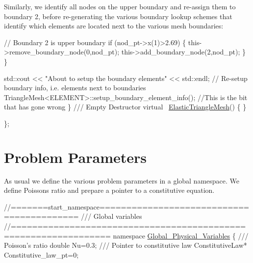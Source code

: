 Similarly, we identify all nodes on the upper boundary and re-\/assign them to boundary 2, before re-\/generating the various boundary lookup schemes that identify which elements are located next to the various mesh boundaries\+:


\begin{DoxyCodeInclude}

     \textcolor{comment}{// Boundary 2 is upper boundary}
     \textcolor{keywordflow}{if} (nod\_pt->x(1)>2.69)
      \{
       this->remove\_boundary\_node(0,nod\_pt);
       this->add\_boundary\_node(2,nod\_pt);
      \}
    \}

   std::cout << \textcolor{stringliteral}{"About to setup the boundary elements"} << std::endl;
   \textcolor{comment}{// Re-setup boundary info, i.e. elements next to boundaries}
   TriangleMesh<ELEMENT>::setup\_boundary\_element\_info();
   \textcolor{comment}{//This is the bit that has gone wrong}
  \}
\textcolor{comment}{}
\textcolor{comment}{ /// Empty Destructor}
\textcolor{comment}{} \textcolor{keyword}{virtual} ~\hyperlink{classElasticTriangleMesh}{ElasticTriangleMesh}() \{ \}

\};

\end{DoxyCodeInclude}




 

\hypertarget{index_namespace}{}\section{Problem Parameters}\label{index_namespace}
As usual we define the various problem parameters in a global namespace. We define Poisson\textquotesingle{}s ratio and prepare a pointer to a constitutive equation.


\begin{DoxyCodeInclude}
\textcolor{comment}{//=======start\_namespace==========================================}
\textcolor{comment}{/// Global variables}
\textcolor{comment}{}\textcolor{comment}{//================================================================}
\textcolor{keyword}{namespace }\hyperlink{namespaceGlobal__Physical__Variables}{Global\_Physical\_Variables}
\{\textcolor{comment}{}
\textcolor{comment}{ /// Poisson's ratio}
\textcolor{comment}{} \textcolor{keywordtype}{double} Nu=0.3;
\textcolor{comment}{}
\textcolor{comment}{ /// Pointer to constitutive law}
\textcolor{comment}{} ConstitutiveLaw* Constitutive\_law\_pt=0;

\end{DoxyCodeInclude}


